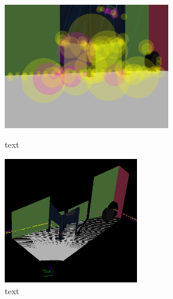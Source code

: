 \documentclass[a4paper]{article}
\begin{document}
\begin{figure}[h]
\centering
\begin{minipage}{0.45\textwidth}
\centering
\includegraphics[height=5.5cm]{slam_house_features_corner_2}
\caption{text}
\end{minipage}
\hspace{1cm}
\begin{minipage}{0.45\textwidth}
\centering
\includegraphics[height=5.5cm]{slam_house_constraints_2}
\caption{text}
\end{minipage}
\end{figure}
\end{document}
